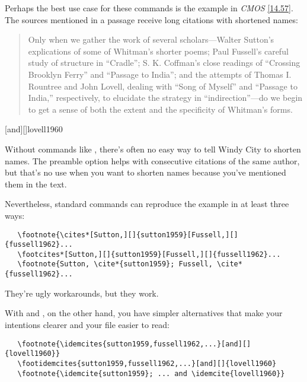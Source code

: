 \documentclass[11pt,letterpaper,oneside]{article}
\begin{document}
Perhaps the best use case for these commands is the example in
\textit{CMOS} \ref{14.57}. The sources mentioned in a passage receive
long citations with shortened names:

\begin{quote} Only when we gather the work of several
scholars---Walter Sutton's explications of some of Whitman's shorter
poems; Paul Fussell's careful study of structure in ``Cradle''; S. K.
Coffman's close readings of ``Crossing Brooklyn Ferry'' and ``Passage
to India''; and the attempts of Thomas I. Rountree and John Lovell,
dealing with ``Song of Myself'' and ``Passage to India,''
respectively, to elucidate the strategy in ``indirection''---do we
begin to get a sense of both the extent and the specificity of
Whitman's forms.\footnotemark[1] \end{quote}

\begin{citenobib}
\item {}[and][]{lovell1960}
\end{citenobib}

Without commands like , there's often no easy way to
tell Windy City to shorten names. The preamble option
 helps with consecutive citations of the same author,
but that's no use when you want to shorten names because you've
mentioned them in the text.

Nevertheless, standard commands can reproduce the example in at least
three ways:

\begin{verbatim}
   \footnote{\cites*[Sutton,][]{sutton1959}[Fussell,][]{fussell1962}...
   \footcites*[Sutton,][]{sutton1959}[Fussell,][]{fussell1962}...
   \footnote{Sutton, \cite*{sutton1959}; Fussell, \cite*{fussell1962}...
\end{verbatim}

\noindent They're ugly workarounds, but they work.

With  and , on the other hand, you
have simpler alternatives that make your intentions clearer and your
file easier to read:

\begin{verbatim}
   \footnote{\idemcites{sutton1959,fussell1962,...}[and][]{lovell1960}}
   \footidemcites{sutton1959,fussell1962,...}[and][]{lovell1960}
   \footnote{\idemcite{sutton1959}; ... and \idemcite{lovell1960}}
\end{verbatim}
\end{document}
